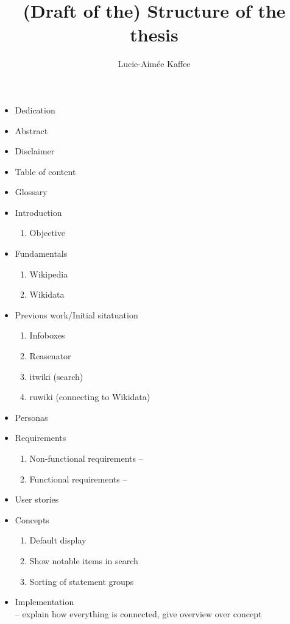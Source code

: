 \documentclass[11pt]{article}
\title {{(Draft of the) Structure of the thesis}}
\author {Lucie-Aim\'{e}e Kaffee}
\date{}
\begin{document}
  \maketitle
  \tableofcontents
  
  \begin{itemize}

  \item Dedication
  \item Abstract
  \item Disclaimer
  \item Table of content
  \item Glossary
  \item Introduction
    \begin{enumerate}
    \item Objective
  \end{enumerate}
  \item Fundamentals
  \begin{enumerate}
    \item Wikipedia
    \item Wikidata
  \end{enumerate}
  \item Previous work/Initial sitatuation
  \begin{enumerate}
    \item Infoboxes
    \item Reasenator
    \item itwiki (search)
    \item ruwiki (connecting to Wikidata)
  \end{enumerate}
  \item Personas
  \item Requirements
  \begin{enumerate}
   \item Non-functional requirements --
   \item Functional requirements -- 
  \end{enumerate}
  \item User stories
  \item Concepts
  \begin{enumerate}
	  \item Default display
	  \item Show notable items in search
	  \item Sorting of statement groups
  \end{enumerate}
  \item Implementation 
  \\ -- explain how everything is connected, give overview over concept

\end{itemize}
\end{document}
